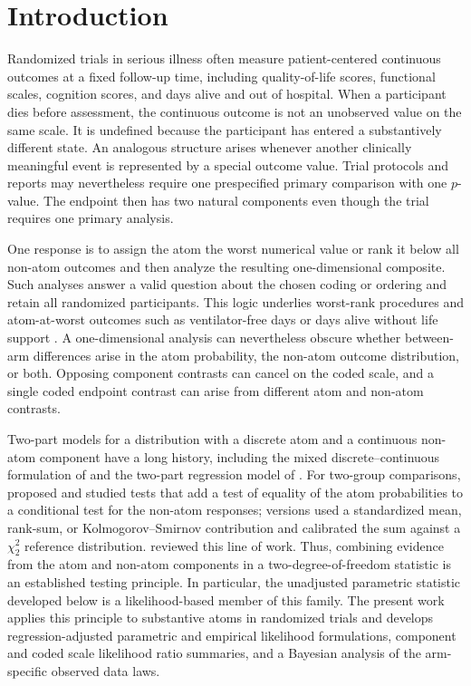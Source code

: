 \documentclass[11pt]{article}
\begin{document}
\section{Introduction}

Randomized trials in serious illness often measure patient-centered continuous outcomes at a fixed follow-up time, including quality-of-life scores, functional scales, cognition scores, and days alive and out of hospital. When a participant dies before assessment, the continuous outcome is not an unobserved value on the same scale. It is undefined because the participant has entered a substantively different state. An analogous structure arises whenever another clinically meaningful event is represented by a special outcome value. Trial protocols and reports may nevertheless require one prespecified primary comparison with one $p$-value. The endpoint then has two natural components even though the trial requires one primary analysis.

One response is to assign the atom the worst numerical value or rank it below all non-atom outcomes and then analyze the resulting one-dimensional composite. Such analyses answer a valid question about the chosen coding or ordering and retain all randomized participants. This logic underlies worst-rank procedures and atom-at-worst outcomes such as ventilator-free days or days alive without life support \citep{Lachin_1999,McMahon_2000,Colantuoni_2018,10.1001/jama.2021.18295,Yehya_2019}. A one-dimensional analysis can nevertheless obscure whether between-arm differences arise in the atom probability, the non-atom outcome distribution, or both. Opposing component contrasts can cancel on the coded scale, and a single coded endpoint contrast can arise from different atom and non-atom contrasts.

Two-part models for a distribution with a discrete atom and a continuous non-atom component have a long history, including the mixed discrete--continuous formulation of \citet{aitchison1955distribution} and the two-part regression model of \citet{cragg1971some}. For two-group comparisons, \citet{lachenbruch1976clumping,lachenbruch2001comparisons} proposed and studied tests that add a test of equality of the atom probabilities to a conditional test for the non-atom responses; versions used a standardized mean, rank-sum, or Kolmogorov--Smirnov contribution and calibrated the sum against a $\chi^2_2$ reference distribution. \citet{lachenbruch2002excess} reviewed this line of work. Thus, combining evidence from the atom and non-atom components in a two-degree-of-freedom statistic is an established testing principle. In particular, the unadjusted parametric statistic developed below is a likelihood-based member of this family. The present work applies this principle to substantive atoms in randomized trials and develops regression-adjusted parametric and empirical likelihood formulations, component and coded scale likelihood ratio summaries, and a Bayesian analysis of the arm-specific observed data laws.
\end{document}
